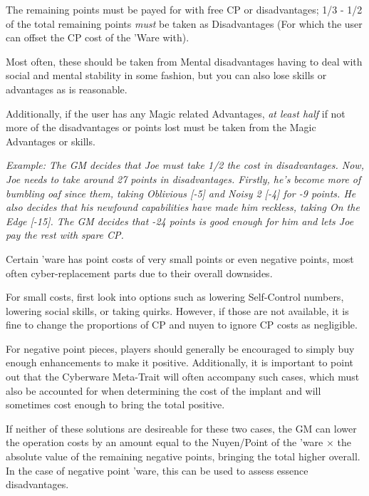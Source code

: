 \begin{multicols*}{3}
	The remaining points must be payed for with free CP or disadvantages; 1/3 - 1/2 of the total remaining points \textit{must} be taken as Disadvantages (For which the user can offset the CP cost of the 'Ware with). 
	
	Most often, these should be taken from Mental disadvantages having to deal with social and mental stability in some fashion, but you can also lose skills or advantages as is reasonable.
	
	Additionally, if the user has any Magic related Advantages, \textit{at least half} if not more of the disadvantages or points lost must be taken from the Magic Advantages or skills.
	
	\begin{wrapfigure}[12]{l}{85pt}
		
	\end{wrapfigure}
	\textit{\textcolor{OliveGreen}{Example: The GM decides that Joe must take 1/2 the cost in disadvantages. Now, Joe needs to take around 27 points in disadvantages. Firstly, he's become more of bumbling oaf since them, taking Oblivious [-5] and Noisy 2 [-4] for -9 points. He also decides that his newfound capabilities have made him reckless, taking On the Edge [-15]. The GM decides that -24 points is good enough for him and lets Joe pay the rest with spare CP.}}
	
	
	Certain 'ware has point costs of very small points or even negative points, most often cyber-replacement parts due to their overall downsides. 
	
	For small costs, first look into options such as lowering Self-Control numbers, lowering social skills, or taking quirks. However, if those are not available, it is fine to change the proportions of CP and nuyen to ignore CP costs as negligible.
	
	For negative point pieces, players should generally be encouraged to simply buy enough enhancements to make it positive. Additionally, it is important to point out that the Cyberware Meta-Trait will often accompany such cases, which must also be accounted for when determining the cost of the implant and will sometimes cost enough to bring the total positive.
	
	If neither of these solutions are desireable for these two cases, the GM can lower the operation costs by an amount equal to the Nuyen/Point of the 'ware $\times$ the absolute value of the remaining negative points, bringing the total higher overall. In the case of negative point 'ware, this can be used to assess essence disadvantages.
	

\end{multicols*}
